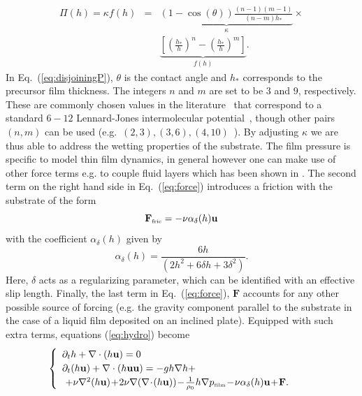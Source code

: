 \begin{eqnarray}\label{eq:disjoiningP}
\Pi(h) = \kappa f(h) &=& \underbrace{(1 - \cos(\theta))\frac{(n-1)(m-1)}{(n-m)h_*}}_{\kappa}\times
\nonumber\\&&\underbrace{\left[\left(\frac{h_*}{h}\right)^n -\left(\frac{h_*}{h}\right)^m\right]}_{f(h)}.
\end{eqnarray}
In Eq.~(\ref{eq:disjoiningP}), $\theta$ is the contact angle and $h_*$
corresponds to the precursor film
thickness. The integers $n$ and $m$ are set to be $3$ and $9$, respectively. These 
are commonly chosen values in the literature~\cite{moulton_lega_2013,RevModPhys.69.931}
that correspond to a standard $6-12$ Lennard-Jones
intermolecular potential~\cite{fischer2018existence}, though other pairs
$(n,m)$ can be used (e.g.~$(2,3), (3,6), (4,10)$~\cite{1742-6596-166-1-012009,
PhysRevLett.119.204501, wedershoven2014infrared}). 
By adjusting $\kappa$ we are thus able to address the wetting properties of the substrate. 
The film pressure is specific to model thin film dynamics, in general however one can make use of other force terms e.g. to couple fluid layers which has been shown in \cite{doi:10.1002/fld.2742}. The second term on the right hand side in Eq.~(\ref{eq:force}) introduces
a friction with the substrate of the form
\begin{equation}\label{eq:forcefric}
\mathbf{F}_{\mbox{\tiny{fric}}} = -\nu \alpha_{\delta}(h)\mathbf{u}
\end{equation}
with the coefficient $\alpha_{\delta}(h)$ given by
\begin{equation}\label{eq:alphafric}
\alpha_{\delta}(h) = \frac{6h}{(2 h^2 + 6 \delta h + 3 \delta^2)}.
\end{equation}
Here, $\delta$ acts as a regularizing parameter, which can 
be identified with an effective slip length. 
Finally, the last term in Eq.~(\ref{eq:force}), $\mathbf{F}$ accounts for any other possible source
of forcing (e.g. the gravity component parallel to the substrate in the case of a liquid film
deposited on an inclined plate).
Equipped with such extra terms, equations (\ref{eq:hydro}) become
\begin{equation}\label{eq:hydro2}
\begin{cases}
\begin{array}{ll}
\partial_t h + \nabla \cdot (h \mathbf{u})  = 0 & \\ 
\partial_t (h \mathbf{u}) + \nabla \cdot (h \mathbf{u}\mathbf{u}) = -gh \nabla h  +\\ 
\,\, +  \nu \nabla^2 (h\mathbf{u}) \!+\! 2\nu \nabla (\nabla\! \cdot\! (h\mathbf{u}))
\!-\!\frac{1}{\rho_0}h\nabla p_{\mbox{\tiny{film}}} \!-\! \nu \alpha_{\delta}(h) \mathbf{u}\!+\! \mathbf{F}. 
\end{array}
\end{cases}
\end{equation}
